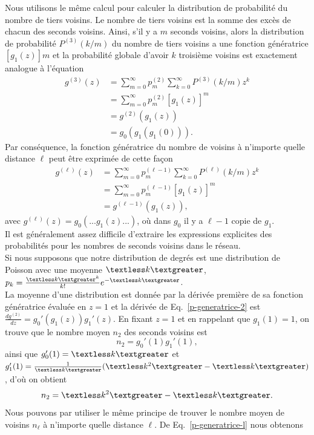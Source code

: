 Nous utilisons le même calcul pour calculer la distribution de probabilité du nombre de tiers voisins. Le nombre de tiers voisins est la somme des excès de chacun des seconds voisins. Ainsi, s'il y a $m$ seconds voisins, alors la distribution de probabilité $P^{(3)}(k/m)$ du nombre de tiers voisins a une fonction génératrice $[g_1(z)]m$ et la probabilité globale d'avoir $k$ troisième voisins est exactement analogue à l'équation
\begin{align}
g^{(3)}(z)&=\sum_{m=0}^{\infty}p_m^{(2)}\sum_{k=0}^{\infty}P^{(3)}(k/m)z^k\\
&=\sum_{m=0}^{\infty}p_m^{(2)}[g_1(z)]^m\nonumber\\
&=g^{(2)}(g_1(z))\nonumber\\
&=g_0(g_1(g_1(0))).
\end{align}
Par conséquence, la fonction génératrice du nombre de voisins à n'importe quelle distance $\ell$ peut être exprimée de cette façon
\begin{align}
g^{(\ell)}(z)&=\sum_{m=0}^{\infty}p_m^{(\ell-1)}\sum_{k=0}^{\infty}P^{(\ell)}(k/m)z^k\\
&=\sum_{m=0}^{\infty}p_m^{(\ell-1)}[g_1(z)]^m\nonumber\\
&=g^{(\ell-1)}(g_1(z)),
\label{p-generatrice-l}
\end{align}
avec $g^{(\ell)}(z)=g_0(...g_1(z)...)$, où dans $g_0$ il y a $\ell-1$ copie de $g_1$.\\
Il est généralement assez difficile d'extraire les expressions explicites des probabilités pour les nombres de seconds voisins dans le réseau.\\
Si nous supposons que notre distribution de degrés est une distribution de Poisson avec une moyenne $\km$, $p_k=\frac{\km^k}{k!}e^{-\km}$.\\
La moyenne d'une distribution est donnée par la dérivée première de sa fonction génératrice évaluée en $z=1$ et la dérivée de Eq.~\eqref{p-generatrice-2} est $\frac{dg^{(2)}}{dz}=g_0'(g_1(z))g_1'(z)$. En fixant $z=1$ et en rappelant que $g_1(1)=1$, on trouve que le nombre moyen $n_2$ des seconds voisins est
\begin{equation}
n_2=g_0'(1)g_1'(1),
\label{3-27}
\end{equation}
ainsi que $g_0'(1)=\km$ et $g_1'(1)=\frac{1}{\km}(\textless k^2\textgreater-\km)$, d'où on obtient
\begin{equation}
n_2=\textless k^2\textgreater-\km.
\end{equation}
Nous pouvons par utiliser le même principe de trouver le nombre moyen de voisins $n_{\ell}$ à n'importe quelle distance $\ell$. De Eq.~\eqref{p-generatrice-l} nous obtenons
